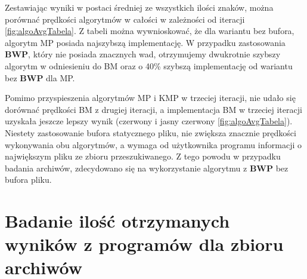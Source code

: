 Zestawiając wyniki w postaci średniej ze wszystkich ilości znaków, można
porównać prędkości algorytmów w całości w zależności od iteracji 
\ref{fig:algoAvgTabela}. Z tabeli można wywnioskować, że dla wariantu bez
bufora, algorytm MP posiada najszybszą implementację. W przypadku zastosowania
\textbf{BWP}, który nie posiada znacznych wad, otrzymujemy dwukrotnie szybszy
algorytm w odniesieniu do BM oraz o 40\% szybszą implementację od 
wariantu bez \textbf{BWP} dla MP. 

Pomimo przyspieszenia algorytmów MP i KMP w trzeciej iteracji, nie udało się
dorównać prędkości BM z drugiej iteracji, a implementacja BM w trzeciej iteracji
uzyskała jeszcze lepszy wynik (czerwony i jasny czerwony \ref{fig:algoAvgTabela}).
Niestety zastosowanie bufora statycznego pliku, nie zwiększa znacznie prędkości
wykonywania obu algorytmów, a wymaga od użytkownika programu informacji o 
największym pliku ze zbioru przeszukiwanego. Z tego powodu w przypadku badania
archiwów, zdecydowano się na wykorzystanie algorytmu z \textbf{BWP} bez
bufora pliku.

\section{Badanie ilość otrzymanych wyników z programów dla zbioru archiwów}

